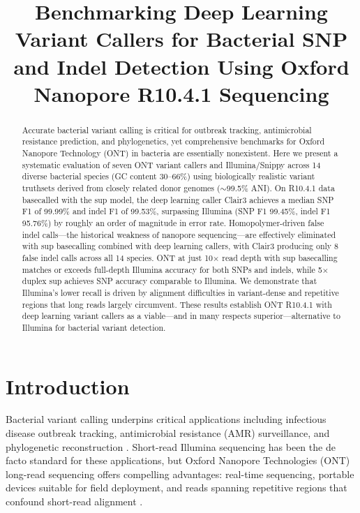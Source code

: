\documentclass[11pt]{article}
\title{Benchmarking Deep Learning Variant Callers for Bacterial SNP and Indel Detection Using Oxford Nanopore R10.4.1 Sequencing}
\author{}
\date{}
\begin{document}
\maketitle

\begin{abstract}
Accurate bacterial variant calling is critical for outbreak tracking, antimicrobial resistance prediction, and phylogenetics, yet comprehensive benchmarks for Oxford Nanopore Technology (ONT) in bacteria are essentially nonexistent. Here we present a systematic evaluation of seven ONT variant callers and Illumina/Snippy across 14 diverse bacterial species (GC content 30--66\%) using biologically realistic variant truthsets derived from closely related donor genomes ($\sim$99.5\% ANI). On R10.4.1 data basecalled with the sup model, the deep learning caller Clair3 achieves a median SNP F1 of 99.99\% and indel F1 of 99.53\%, surpassing Illumina (SNP F1 99.45\%, indel F1 95.76\%) by roughly an order of magnitude in error rate. Homopolymer-driven false indel calls---the historical weakness of nanopore sequencing---are effectively eliminated with sup basecalling combined with deep learning callers, with Clair3 producing only 8 false indel calls across all 14 species. ONT at just 10$\times$ read depth with sup basecalling matches or exceeds full-depth Illumina accuracy for both SNPs and indels, while 5$\times$ duplex sup achieves SNP accuracy comparable to Illumina. We demonstrate that Illumina's lower recall is driven by alignment difficulties in variant-dense and repetitive regions that long reads largely circumvent. These results establish ONT R10.4.1 with deep learning variant callers as a viable---and in many respects superior---alternative to Illumina for bacterial variant detection.
\end{abstract}

\section{Introduction}

Bacterial variant calling underpins critical applications including infectious disease outbreak tracking, antimicrobial resistance (AMR) surveillance, and phylogenetic reconstruction \citep{didelot2012transforming,quainoo2017whole}. Short-read Illumina sequencing has been the de facto standard for these applications, but Oxford Nanopore Technologies (ONT) long-read sequencing offers compelling advantages: real-time sequencing, portable devices suitable for field deployment, and reads spanning repetitive regions that confound short-read alignment \citep{wang2021nanopore}.
\end{document}
